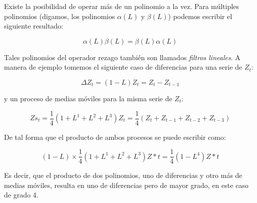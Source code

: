\documentclass[
  a4paper,
]{article}
\begin{document}
Existe la posibilidad de operar más de un polinomio a la vez. Para
múltiples polinomios (digamos, los polinomios \(\alpha(L)\) y
\(\beta(L)\)) podemos escribir el siguiente resultado:

\[
\alpha(L) \beta(L) = \beta(L) \alpha(L)
\]

Tales polinomios del operador rezago también son llamados \emph{filtros
lineales}. A manera de ejemplo tomemos el siguiente caso de diferencias
para una serie de \(Z_t\):

\[
\Delta Z_{t} = (1 - L) Z_{t} = Z_{t} - Z_{t-1}
\]

y un proceso de medias móviles para la misma serie de \(Z_t\):

\[
Zs_{t} = \frac{1}{4}(1 + L^1 + L^2 + L^3) Z_{t} = \frac{1}{4}(Z_{t} + Z_{t-1} + Z_{t-2} + Z_{t-3})
\]

De tal forma que el producto de ambos procesos se puede escribir como:

\[
(1 - L) \times \frac{1}{4}(1 + L^1 + L^2 + L^3) Z*{t} = \frac{1}{4}(1 - L^4) Z*{t}
\]

Es decir, que el producto de dos polinomios, uno de diferencias y otro
más de medias móviles, resulta en uno de diferencias pero de mayor
grado, en este caso de grado 4.


\printbibliography
\end{document}
